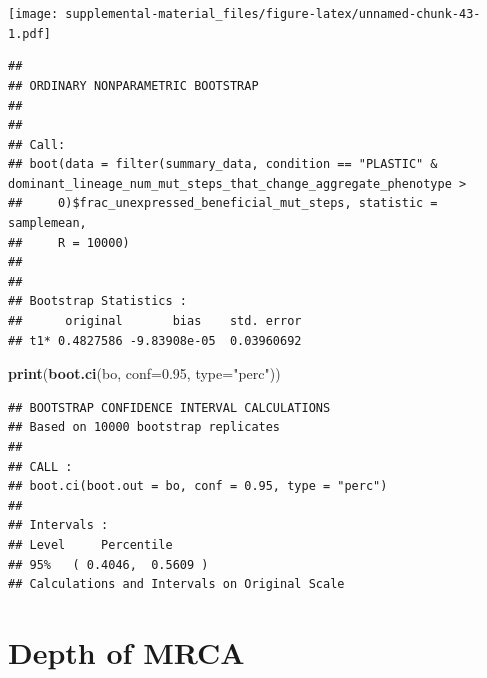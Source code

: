 \documentclass[]{book}
\newenvironment{Shaded}{\begin{snugshade}}{\end{snugshade}}
\newcommand{\DataTypeTok}[1]{\textcolor[rgb]{0.13,0.29,0.53}{#1}}
\newcommand{\DecValTok}[1]{\textcolor[rgb]{0.00,0.00,0.81}{#1}}
\newcommand{\FloatTok}[1]{\textcolor[rgb]{0.00,0.00,0.81}{#1}}
\newcommand{\KeywordTok}[1]{\textcolor[rgb]{0.13,0.29,0.53}{\textbf{#1}}}
\newcommand{\NormalTok}[1]{#1}
\newcommand{\OperatorTok}[1]{\textcolor[rgb]{0.81,0.36,0.00}{\textbf{#1}}}
\newcommand{\StringTok}[1]{\textcolor[rgb]{0.31,0.60,0.02}{#1}}
\begin{document}
\texttt{[image: supplemental-material\_files/figure-latex/unnamed-chunk-43-1.pdf]}

\begin{Shaded}
\end{Shaded}

\begin{verbatim}
## 
## ORDINARY NONPARAMETRIC BOOTSTRAP
## 
## 
## Call:
## boot(data = filter(summary_data, condition == "PLASTIC" & dominant_lineage_num_mut_steps_that_change_aggregate_phenotype > 
##     0)$frac_unexpressed_beneficial_mut_steps, statistic = samplemean, 
##     R = 10000)
## 
## 
## Bootstrap Statistics :
##      original       bias    std. error
## t1* 0.4827586 -9.83908e-05  0.03960692
\end{verbatim}

\begin{Shaded}
\begin{Highlighting}[]
\KeywordTok{print}\NormalTok{(}\KeywordTok{boot.ci}\NormalTok{(bo, }\DataTypeTok{conf=}\FloatTok{0.95}\NormalTok{, }\DataTypeTok{type=}\StringTok{"perc"}\NormalTok{))}
\end{Highlighting}
\end{Shaded}

\begin{verbatim}
## BOOTSTRAP CONFIDENCE INTERVAL CALCULATIONS
## Based on 10000 bootstrap replicates
## 
## CALL : 
## boot.ci(boot.out = bo, conf = 0.95, type = "perc")
## 
## Intervals : 
## Level     Percentile     
## 95%   ( 0.4046,  0.5609 )  
## Calculations and Intervals on Original Scale
\end{verbatim}

\hypertarget{depth-of-mrca}{%
\section{Depth of MRCA}\label{depth-of-mrca}}
\end{document}

